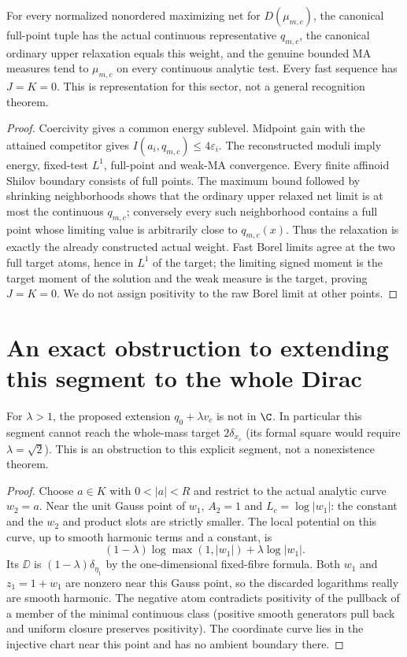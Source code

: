\begin{corollary}\label{newns:nonordered}
For every normalized nonordered maximizing net for $D(\mu_{m,c})$,
the canonical full-point tuple has the actual continuous representative
$q_{m,c}$, the canonical ordinary upper relaxation equals this weight,
and the genuine bounded MA measures tend to $\mu_{m,c}$ on every
continuous analytic test. Every fast sequence has $J=K=0$.
This is representation for this sector, not a general recognition theorem.
\end{corollary}
\begin{proof}
Coercivity gives a common energy sublevel. Midpoint gain with the
attained competitor gives $I(a_i,q_{m,c})\le4\varepsilon_i$.
The reconstructed moduli imply energy, fixed-test $L^1$, full-point
and weak-MA convergence. Every finite affinoid Shilov boundary consists
of full points. The maximum bound followed by shrinking neighborhoods
shows that the ordinary upper relaxed net limit is at most the continuous
$q_{m,c}$; conversely every such neighborhood contains a full point
whose limiting value is arbitrarily close to $q_{m,c}(x)$.
Thus the relaxation is exactly the already constructed actual weight.
Fast Borel limits agree at the two full target atoms, hence in $L^1$
of the target; the limiting signed moment is the target moment of the
solution and the weak measure is the target, proving $J=K=0$.
We do not assign positivity to the raw Borel limit at other points.
\end{proof}

\section{An exact obstruction to extending this segment to the whole Dirac}
\begin{proposition}\label{newns:obstruction}
For $\lambda>1$, the proposed extension $q_0+\lambda v_c$ is not
in $\C$. In particular this segment cannot reach the whole-mass target
$2\delta_{x_c}$ (its formal square would require $\lambda=\sqrt2$).
This is an obstruction to this explicit segment, not a nonexistence theorem.
\end{proposition}
\begin{proof}
Choose $a\in K$ with $0<|a|<R$ and restrict to the actual analytic
curve $w_2=a$. Near the unit Gauss point of $w_1$, $A_2=1$ and
$L_c=\log|w_1|$: the constant and the $w_2$ and product slots are
strictly smaller. The local potential on this curve, up to smooth
harmonic terms and a constant, is
\[
 (1-\lambda)\log\max(1,|w_1|)+\lambda\log|w_1|.
\]
Its $\DD$ is $(1-\lambda)\delta_{\eta_1}$ by the one-dimensional
fixed-fibre formula. Both $w_1$ and $z_1=1+w_1$ are nonzero near
this Gauss point, so the discarded logarithms really are smooth harmonic.
The negative atom contradicts positivity of the pullback of a member of
the minimal continuous class (positive smooth generators pull back and
uniform closure preserves positivity). The coordinate curve lies in the
injective chart near this point and has no ambient boundary there.
\end{proof}

